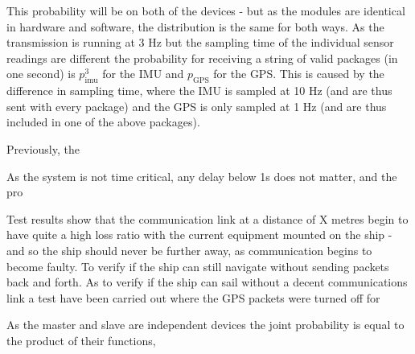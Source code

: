 This probability will be on both of the devices - but as the modules are identical in hardware and software, the distribution is the same for both ways. As the transmission is running at 3 Hz but the sampling time of the individual sensor readings are different the probability for receiving a string of valid packages (in one second) is $p_\text{imu}^{3}$ for the IMU and $p_\text{GPS}$ for the GPS. This is caused by the difference in sampling time, where the IMU is sampled at 10 Hz (and are thus sent with every package) and the GPS is only sampled at 1 Hz (and are thus included in one of the above packages). 


Previously, the

As the system is not time critical, any delay below 1s does not matter, and the pro


Test results show that the communication link at a distance of X metres begin to have quite a high loss ratio with the current equipment mounted on the ship - and so the ship should never be further away, as communication begins to become faulty. To verify if the ship can still navigate without sending packets back and forth. As to verify if the ship can sail without a decent communications link a test have been carried out where the GPS packets were turned off for 

As the master and slave are independent devices the joint probability is equal to the product of their functions, 